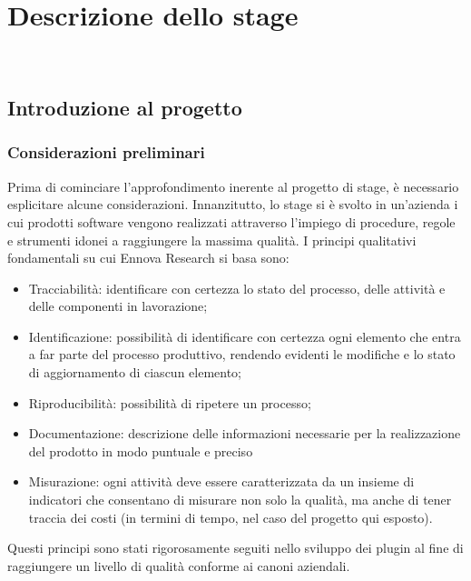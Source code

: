 
\chapter{Descrizione dello stage}
\label{cap:descrizione-stage}

\\

\section{Introduzione al progetto}
\subsection{Considerazioni preliminari}
Prima di cominciare l’approfondimento inerente al progetto di stage, è necessario
esplicitare alcune considerazioni. Innanzitutto, lo stage si è svolto in un’azienda i
cui prodotti software vengono realizzati attraverso l’impiego di procedure, regole e
strumenti idonei a raggiungere la massima qualità. I principi qualitativi fondamentali
su cui Ennova Research si basa sono:
\begin{itemize}
\item Tracciabilità: identificare con certezza lo stato del processo, delle attività e delle
componenti in lavorazione;
\item Identificazione: possibilità di identificare con certezza ogni elemento che entra a
far parte del processo produttivo, rendendo evidenti le modifiche e lo stato di
aggiornamento di ciascun elemento;
\item Riproducibilità: possibilità di ripetere un processo;
\item Documentazione: descrizione delle informazioni necessarie per la realizzazione
del prodotto in modo puntuale e preciso
\item Misurazione: ogni attività deve essere caratterizzata da un insieme di indicatori
che consentano di misurare non solo la qualità, ma anche di tener traccia dei costi (in termini di tempo, nel caso del progetto qui esposto).
\end{itemize}
Questi principi sono stati rigorosamente seguiti nello sviluppo dei plugin al fine di
raggiungere un livello di qualità conforme ai canoni aziendali.
